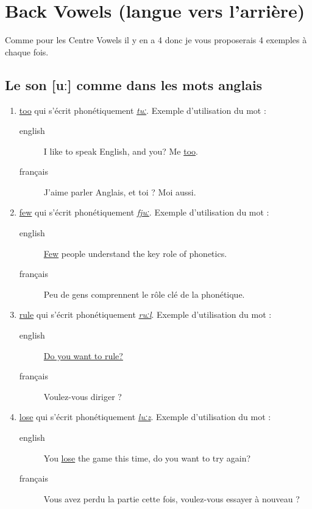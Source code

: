 \documentclass[12pt,a4paper]{book}
\begin{document}
\section{Back Vowels (langue vers l'arrière)}
\label{sec:org02857bf}
Comme pour les Centre Vowels il y en a 4 donc je vous proposerais 4
exemples à chaque fois.
\subsection{Le son [uː] comme dans les mots anglais}
\label{sec:org635c7e0}
\begin{enumerate}
\item \href{http://www.wordreference.com/enfr/too}{too} qui s'écrit phonétiquement \href{https://en.oxforddictionaries.com/definition/too}{\emph{tuː}}. Exemple d'utilisation du mot :
\begin{description}
\item[{english}] \textenglish{I like to speak English, and you? Me \href{https://youtu.be/RaveinO4\_vs}{too}.}
\item[{français}] J'aime parler Anglais, et toi ? Moi aussi.
\end{description}
\item \href{http://www.wordreference.com/enfr/few}{few} qui s'écrit phonétiquement \href{https://en.oxforddictionaries.com/definition/few}{\emph{fjuː}}. Exemple d'utilisation du mot :
\begin{description}
\item[{english}] \textenglish{\href{https://youtu.be/r3TaGhdqEiA}{Few} people understand the key role of phonetics.}
\item[{français}] Peu de gens comprennent le rôle clé de la phonétique.
\end{description}
\item \href{http://www.wordreference.com/enfr/rule}{rule} qui s'écrit phonétiquement \href{https://en.oxforddictionaries.com/definition/rule}{\emph{ruːl}}. Exemple d'utilisation du mot : 
\begin{description}
\item[{english}] \textenglish{\href{https://youtu.be/rStL7niR7gs}{Do you want to rule?}}
\item[{français}] Voulez-vous diriger ?
\end{description}
\item \href{http://www.wordreference.com/enfr/lose}{lose} qui s'écrit phonétiquement \href{https://en.oxforddictionaries.com/definition/lose}{\emph{luːz}}. Exemple d'utilisation du mot :
\begin{description}
\item[{english}] \textenglish{You \href{https://youtu.be/UNcCTgA5lzo}{lose} the game this time, do you want to try again?}
\item[{français}] Vous avez perdu la partie cette fois, voulez-vous
essayer à nouveau ?
\end{description}
\end{enumerate}
\end{document}
